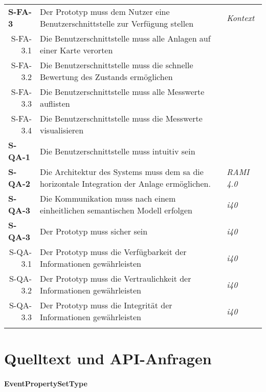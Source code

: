 \begin{tabularx}{\textwidth}{@{}lXp{2cm}@{}}
      \textbf{S-FA-3}              &  Der Prototyp muss dem Nutzer eine Benutzerschnittstelle zur Verfügung stellen    & \textit{Kontext}  \\
      \multicolumn{1}{r}{S-FA-3.1} &  Die Benutzerschnittstelle muss alle Anlagen auf einer Karte verorten \\
      \multicolumn{1}{r}{S-FA-3.2} &  Die Benutzerschnittstelle muss die schnelle Bewertung des Zustands ermöglichen \\
      \multicolumn{1}{r}{S-FA-3.3} &  Die Benutzerschnittstelle muss alle Messwerte auflisten \\
      \multicolumn{1}{r}{S-FA-3.4} &  Die Benutzerschnittstelle muss die Messwerte visualisieren \\
      \textbf{S-QA-1}              & Die Benutzerschnittstelle muss intuitiv sein   \\
      \textbf{S-QA-2}              & Die Architektur des Systems muss dem \ac{sa} die horizontale Integration der Anlage ermöglichen.   & \textit{RAMI 4.0} \\
      \textbf{S-QA-3}              &  Die Kommunikation muss nach einem einheitlichen semantischen Modell erfolgen  & \textit{\ac{i40}} \\
      \textbf{S-QA-3}              &  Der Prototyp muss sicher sein  & \textit{\ac{i40}} \\
      \multicolumn{1}{r}{S-QA-3.1}              &  Der Prototyp muss die Verfügbarkeit der Informationen gewährleisten  & \textit{\ac{i40}} \\
      \multicolumn{1}{r}{S-QA-3.2}              &  Der Prototyp muss die Vertraulichkeit der Informationen gewährleisten  & \textit{\ac{i40}} \\
      \multicolumn{1}{r}{S-QA-3.3}              &  Der Prototyp muss die Integrität der Informationen gewährleisten & \textit{\ac{i40}} \\
      \addlinespace
      \bottomrule
      \caption{Anforderungen aus Systemebene}
      \label{system_anforderungen}
  \end{tabularx}

\section{Quelltext und API-Anfragen}

\paragraph{EventPropertySetType}

